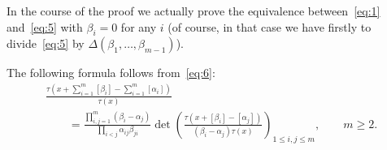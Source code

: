 \documentclass[pdftex]{sigma}
\begin{document}
\begin{remark}\label{remark1}
In the course of the proof we actually prove the equivalence between~\eqref{eq:1} and~\eqref{eq:5} with
$\beta_i=0$ for any $i$ (of course, in that case we have f\/irstly to divide~\eqref{eq:5} by
$\Delta(\beta_1,\dots,\beta_{m-1})$).
\end{remark}
\begin{proposition}\label{proposition2}
The following formula follows from~\eqref{eq:6}:
\begin{gather}
\frac{\tau\left(x+\sum\limits_{i=1}^{m}[\beta_i]-\sum\limits_{i=1}^{m}[\alpha_i]\right)}{\tau(x)}
\nonumber
\\
\qquad
=\frac{\prod\limits_{i,j=1}^{m}
(\beta_i-\alpha_j)}{\prod\limits_{i<j}\alpha_{ij}\beta_{ji}}\det\left(\frac{\tau(x+[\beta_i]-[\alpha_j])}
{(\beta_i-\alpha_j)\tau(x)}\right)_{1\le i,j\le m},
\qquad
m\ge2.
\label{eq:12}
\end{gather}
\end{proposition}
\end{document}
